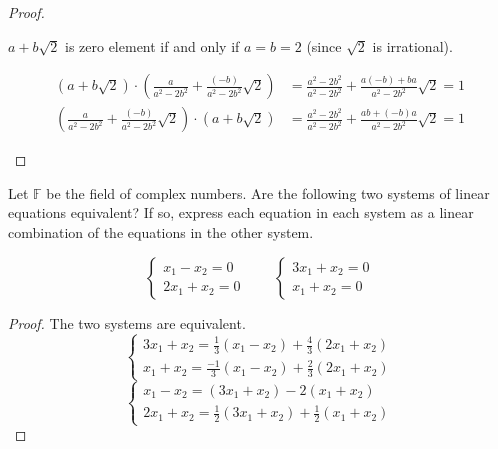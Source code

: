 \begin{proof}
\begin{enumerate}[label = (\arabic*)]
              $a + b\sqrt{2}$ is zero element if and only if $a = b = 2$ (since $\sqrt{2}$ is irrational).

              \begin{align*}
                  (a + b\sqrt{2})\cdot \left( \frac{a}{a^{2} - 2b^{2}} + \frac{(-b)}{a^{2} - 2b^{2}}\sqrt{2} \right) & = \frac{a^{2} - 2b^{2}}{a^{2} - 2b^{2}} + \frac{a(-b) + ba}{a^{2} - 2b^{2}}\sqrt{2} = 1 \\
                  \left( \frac{a}{a^{2} - 2b^{2}} + \frac{(-b)}{a^{2} - 2b^{2}}\sqrt{2} \right)\cdot (a + b\sqrt{2}) & = \frac{a^{2} - 2b^{2}}{a^{2} - 2b^{2}} + \frac{ab + (-b)a}{a^{2} - 2b^{2}}\sqrt{2} = 1
              \end{align*}
    \end{enumerate}
\end{proof}

Let $\mathbb{F}$ be the field of complex numbers. Are the following two systems of linear equations equivalent? If so, express each equation in each system as a linear combination of the equations in the other system.

\begin{exercise}
    \[
        \begin{cases}
            x_{1} - x_{2} = 0 \\
            2x_{1} + x_{2} = 0
        \end{cases}
        \qquad
        \begin{cases}
            3x_{1} + x_{2} = 0 \\
            x_{1} + x_{2} = 0
        \end{cases}
    \]
\end{exercise}

\begin{proof}
    The two systems are equivalent.
    \[
        \begin{cases}
            3x_{1} + x_{2} = \frac{1}{3}(x_{1} - x_{2}) + \frac{4}{3}(2x_{1} + x_{2}) \\
            x_{1} + x_{2} =  \frac{-1}{3}(x_{1} - x_{2}) + \frac{2}{3}(2x_{1} + x_{2})
        \end{cases}
    \]
    \[
        \begin{cases}
            x_{1} - x_{2} = (3x_{1} + x_{2}) - 2(x_{1} + x_{2}) \\
            2x_{1} + x_{2} = \frac{1}{2}(3x_{1} + x_{2}) + \frac{1}{2}(x_{1} + x_{2})
        \end{cases}
    \]
\end{proof}

